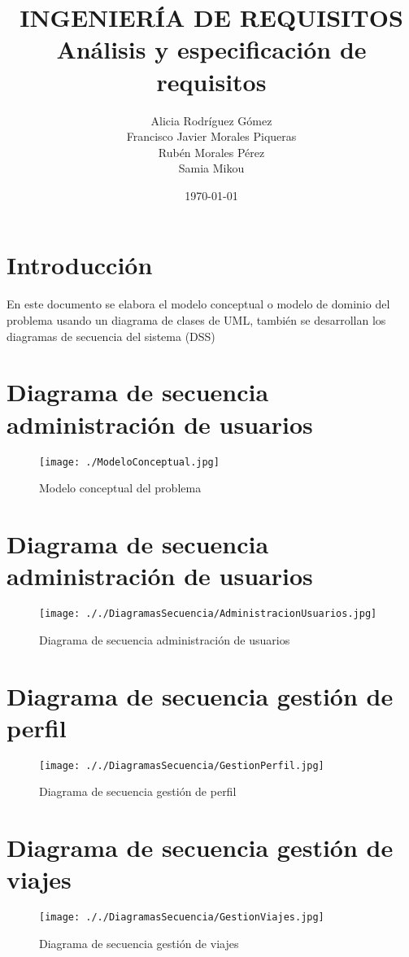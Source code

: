 \documentclass[11pt,spanish]{article} %
\title{INGENIERÍA DE REQUISITOS \\
	Análisis y especificación de requisitos}
\author{Alicia Rodríguez Gómez \\
	Francisco Javier Morales Piqueras \\
	Rubén Morales Pérez \\
	Samia Mikou}
\date{\today}
\begin{document}
\maketitle
\tableofcontents %
\setlength\parindent{0pt} %
\newpage 

\vspace{5cm}
\section{Introducción}
En este documento se elabora el modelo conceptual o modelo de dominio del problema usando un diagrama de clases de UML, también se desarrollan los diagramas de secuencia del sistema (DSS)



\section{Diagrama de secuencia administración de usuarios}
\begin{figure}[H]
	\centering
	\label{ModeloConceptual}
	\texttt{[image: ./ModeloConceptual.jpg]}
	\caption{Modelo conceptual del problema}
\end{figure}

\section{Diagrama de secuencia administración de usuarios}
\begin{figure}[H]
	\centering
	\label{AdministracionUsuarios}
	\texttt{[image: ././DiagramasSecuencia/AdministracionUsuarios.jpg]}
	\caption{Diagrama de secuencia administración de usuarios}
\end{figure}

\section{Diagrama de secuencia gestión de perfil}
\begin{figure}[H]
	\centering
	\label{GestionPerfil}
	\texttt{[image: ././DiagramasSecuencia/GestionPerfil.jpg]}
	\caption{Diagrama de secuencia gestión de perfil}
\end{figure}

\section{Diagrama de secuencia gestión de viajes}
\begin{figure}[H]
	\centering
	\label{GestionViaje}
	\texttt{[image: ././DiagramasSecuencia/GestionViajes.jpg]}
	\caption{Diagrama de secuencia gestión de viajes}
\end{figure}
\end{document}
